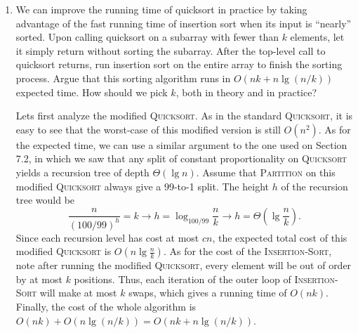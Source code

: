 \documentclass{report}
\makeatletter
\renewenvironment{framed}{%
 \def\FrameCommand##1{\hskip\@totalleftmargin
 \fboxsep=\FrameSep\fbox{##1}}%
 \MakeFramed {\advance\hsize-\width
   \@totalleftmargin\z@ \linewidth\hsize
   \@setminipage}}%
 {\par\unskip\endMakeFramed}
\DeclarePairedDelimiter{\floor}{\lfloor}{\rfloor}
\makeatother
\begin{document}
\begin{enumerate}
\begin{framed}
Combining equations $(7.2)$ and $(7.3)$, we get
\begin{equation*}
\begin{aligned}
  \text{E}[X] &=   \sum_{i = 1}^{n - 1} \sum_{j = i + 1}^{n} \frac{2}{j - i + 1}\\
              &=   \sum_{i = 1}^{\floor{n/2}} \sum_{k = 1}^{n - i} \frac{2}{k + 1} +
                   \sum_{i = \floor{n/2} + 1}^{n - 1} \sum_{k = 1}^{n - i} \frac{2}{k + 1}\\
              &\ge \sum_{i = 1}^{\floor{n/2}} \sum_{k = 1}^{n - i} \frac{2}{k + 1}\\
              &\ge \sum_{i = 1}^{\floor{n/2}} \sum_{k = 1}^{n/2} \frac{2}{k + 1}\\
              &\ge \sum_{i = 1}^{\floor{n/2}} \sum_{k = 1}^{n/2} \frac{1}{k} & \text{(since $k \ge 1$)}\\
              &= \Bigl\lfloor \frac{n}{2} \Bigr\rfloor \cdot \left(\lg \left( \frac{n}{2} \right) + O(1) \right) & \text{(approx. of harmonic number)}\\
              &= \Omega(n \lg n).
\end{aligned}
\end{equation*}
\end{framed}

\item[7.4{-}5]{We can improve the running time of quicksort in practice by
taking advantage of the fast running time of insertion sort when its input is
``nearly'' sorted. Upon calling quicksort on a subarray with fewer than
$k$ elements, let it simply return without sorting the subarray. After the
top-level call to quicksort returns, run insertion sort on the entire array
to finish the sorting process. Argue that this sorting algorithm runs in
$O(nk + n \lg(n/k))$ expected time. How should we pick $k$, both in theory and
in practice?}

\begin{framed}
Lets first analyze the modified \textsc{Quicksort}. As in the standard
\textsc{Quicksort}, it is easy to see that the worst-case of this modified
version is still $O(n^2)$. As for the expected time, we can use a similar
argument to the one used on Section 7.2, in which we saw that any split of
constant proportionality on \textsc{Quicksort} yields a recursion tree of
depth $\Theta(\lg n)$. Assume that \textsc{Partition} on this modified
\textsc{Quicksort} always give a 99-to-1 split. The height $h$ of the recursion
tree would be
\[
  \frac{n}{(100/99)^h} = k \rightarrow h = \log_{100/99} \frac{n}{k} \rightarrow h = \Theta\left(\lg \frac{n}{k}\right).
\]
Since each recursion level has cost at most $cn$, the expected total cost of
this modified \textsc{Quicksort} is $O(n \lg \frac{n}{k})$. As for the cost of
the \textsc{Insertion-Sort}, note after running the modified \textsc{Quicksort},
every element will be out of order by at most $k$ positions. Thus, each
iteration of the outer loop of \textsc{Insertion-Sort} will make at most $k$
swaps, which gives a running time of $O(nk)$. Finally, the cost of the whole
algorithm is $O(nk) + O(n \lg (n/k)) = O(nk + n \lg (n/k))$.
\end{framed}


\end{enumerate}
\end{document}
